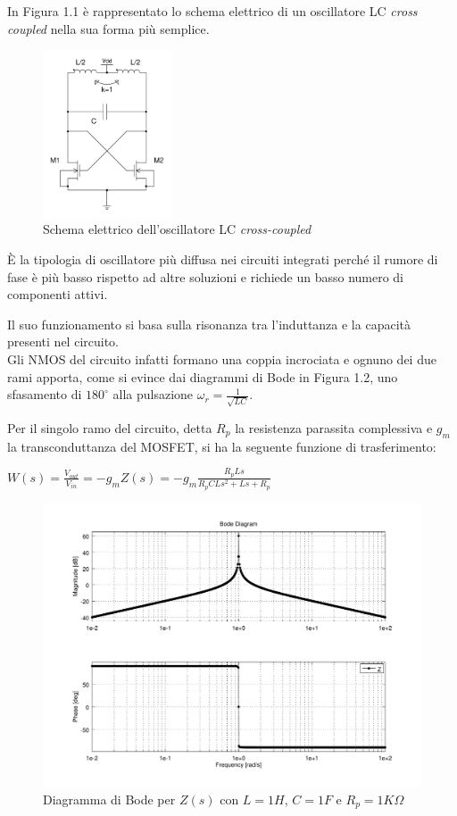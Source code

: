 \documentclass[a4paper, 12pt]{memoir}
\begin{document}
In Figura 1.1 è rappresentato lo schema elettrico di un oscillatore LC
\emph{cross coupled} nella sua forma più semplice.\\
\begin{figure}[h]
\centering
\includegraphics[width=0.34\textwidth]{images/LCosc.pdf}
\caption{Schema elettrico dell'oscillatore LC \emph{cross-coupled}}
\end{figure}
\`E la tipologia di oscillatore più diffusa nei circuiti integrati perché il
rumore di fase è più basso rispetto ad altre soluzioni e richiede un basso
numero di componenti attivi\cite{Amran05}\cite{RazaviRF}.

Il suo funzionamento si basa sulla risonanza tra l'induttanza e la capacità
presenti nel circuito. \\
Gli NMOS del circuito infatti formano una coppia incrociata e ognuno dei due
rami apporta, come si evince dai diagrammi di Bode in Figura 1.2, uno
sfasamento di $ 180^{\circ} $ alla pulsazione $ \omega _r=\frac{1}{\sqrt{LC}} $.

Per il singolo ramo del circuito, detta $ R_p $ la resistenza parassita
complessiva e $ g_m $ la transconduttanza del MOSFET, si ha la seguente
funzione di trasferimento:
\begin{center}
$ W(s)=\frac{V_{out}}{V_{in}}=-g_m Z(s)=-g_m \frac{R_p L s}{R_p C L s^2 + Ls + R_p} $
\end{center}

\begin{figure}[h]
\centering
\includegraphics[width=\textwidth]{images/BodeLC.pdf}
\caption{Diagramma di Bode per $ Z(s) $ con $L=1H$, $C=1F$ e $R_p=1K\Omega$}
\end{figure}
\end{document}
